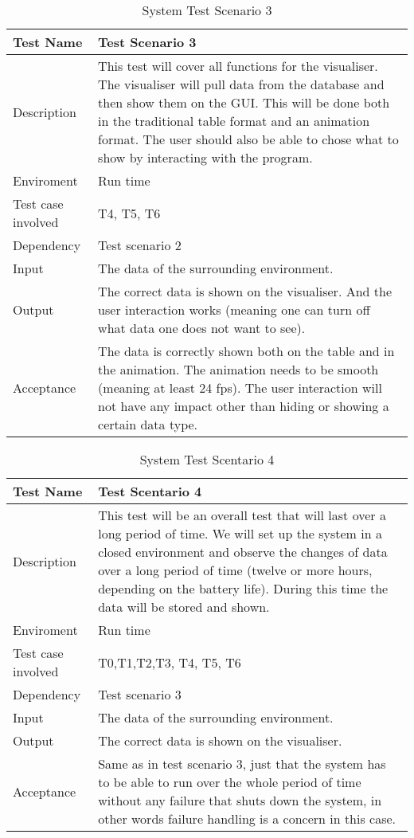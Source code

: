 \documentclass[../document]{subfiles}
\begin{document}
\begin{table}[H]
\caption{System Test Scenario 3}
\centering
\begin{tabularx}{\textwidth}{|l|X|}
	\hline
	Test Name
	&Test Scenario 3
	\\ \hline Description
	&This test will cover all functions for the visualiser. The visualiser will pull data from the database and then show them on the GUI. This will be done both in the traditional table format and an animation format. The user should also be able to chose what to show by interacting with the program.
	\\ \hline Enviroment
	&Run time
	\\ \hline Test case involved
	&T4, T5, T6
	\\ \hline Dependency
	&Test scenario 2
	\\ \hline Input
	&The data of the surrounding environment.
	\\ \hline Output
	&The correct data is shown on the visualiser. And the user interaction works (meaning one can turn off what data one does not want to see).
	\\ \hline Acceptance
	&The data is correctly shown both on the table and in the animation. The animation needs to be smooth (meaning at least 24 fps). The user interaction will not have any impact other than hiding or showing a certain data type.
	\\ \hline 
\end{tabularx}
\end{table}

\begin{table}[H]
\caption{System Test Scentario 4}
\centering
\begin{tabularx}{\textwidth}{|l|X|}
	\hline
	Test Name
	&Test Scentario 4
	\\ \hline Description
	&This test will be an overall test that will last over a long period of time. We will set up the system in a closed environment and observe the changes of data over a long period of time (twelve or more hours, depending on the battery life). During this time the data will be stored and shown.
	\\ \hline Enviroment
	&Run time
	\\ \hline Test case involved
	&T0,T1,T2,T3, T4, T5, T6
	\\ \hline Dependency
	&Test scenario 3
	\\ \hline Input
	&The data of the surrounding environment.
	\\ \hline Output
	&The correct data is shown on the visualiser.
	\\ \hline Acceptance
	&Same as in test scenario 3, just that the system has to be able to run over the whole period of time without any failure that shuts down the system, in other words failure handling is a concern in this case.
	\\ \hline 
\end{tabularx}
\end{table}
\end{document}
